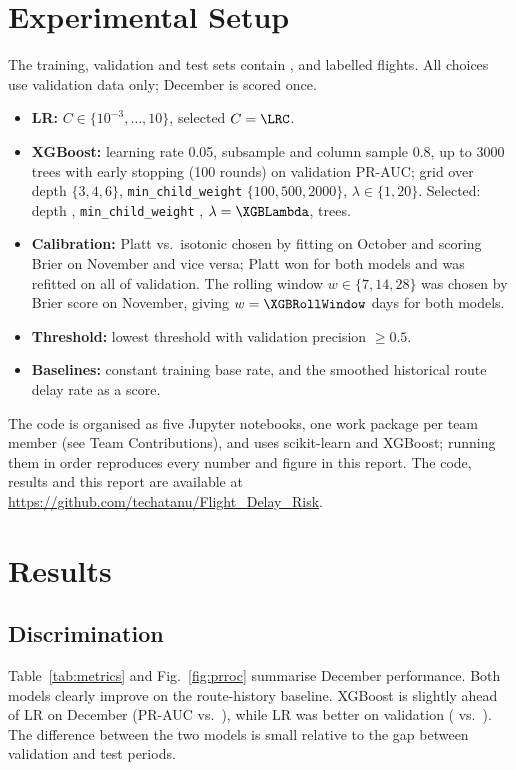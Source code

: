 \documentclass[conference]{IEEEtran}
\begin{document}
\section{Experimental Setup}
The training, validation and test sets contain \NTrain, \NVal{} and \NTest{} labelled
flights. All choices use validation data only; December is scored once.
\begin{itemize}
\item \textbf{LR:} $C \in \{10^{-3}, \dots, 10\}$, selected $C=\LRC$.
\item \textbf{XGBoost:} learning rate 0.05, subsample and column sample 0.8, up to 3000
trees with early stopping (100 rounds) on validation PR-AUC; grid over depth
$\{3,4,6\}$, \texttt{min\_child\_weight} $\{100,500,2000\}$, $\lambda \in \{1,20\}$.
Selected: depth \XGBDepth, \texttt{min\_child\_weight} \XGBMinChild, $\lambda=\XGBLambda$,
\XGBTrees{} trees.
\item \textbf{Calibration:} Platt vs.\ isotonic chosen by fitting on October and scoring
Brier on November and vice versa; Platt won for both models and was refitted on all of
validation. The rolling window $w \in \{7, 14, 28\}$ was chosen by Brier score on
November, giving $w = \XGBRollWindow$ days for both models.
\item \textbf{Threshold:} lowest threshold with validation precision $\ge 0.5$.
\item \textbf{Baselines:} constant training base rate, and the smoothed historical route
delay rate as a score.
\end{itemize}
The code is organised as five Jupyter notebooks, one work package per team member
(see Team Contributions), and uses scikit-learn \cite{pedregosa2011}
and XGBoost; running them in order reproduces every number and figure in this report. The code,
results and this report are available at
\url{https://github.com/techatanu/Flight_Delay_Risk}.

\section{Results}
\subsection{Discrimination}
Table~\ref{tab:metrics} and Fig.~\ref{fig:prroc} summarise December performance. Both
models clearly improve on the route-history baseline. XGBoost is slightly ahead of LR
on December (PR-AUC \XGBTestPRAUC{} vs.\ \LRTestPRAUC), while LR was better on
validation (\LRValPRAUC{} vs.\ \XGBValPRAUC). The difference between the two models is
small relative to the gap between validation and test periods.
\end{document}
